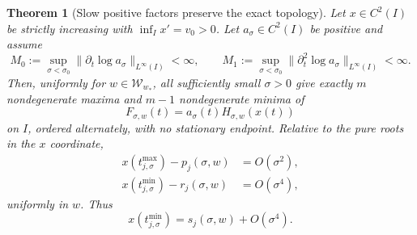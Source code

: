 \documentclass{iopjournal}
\theoremstyle{plain}
\newtheorem{theorem}{Theorem}
\theoremstyle{definition}
\begin{document}
\begin{theorem}[Slow positive factors preserve the exact topology]
\label{thm:exactmfull-slow-factor}
Let \(x\in C^2(I)\) be strictly increasing with
\(\inf_Ix'=v_0>0\).  Let \(a_\sigma\in C^2(I)\) be positive and assume
\begin{equation}
 M_0:=\sup_{\sigma<\sigma_0}
 \|\partial_t\log a_\sigma\|_{L^\infty(I)}<\infty,
 \qquad
 M_1:=\sup_{\sigma<\sigma_0}
 \|\partial_t^2\log a_\sigma\|_{L^\infty(I)}<\infty.
 \label{eq:exactmfull-slow-factor-hypothesis}
\end{equation}
Then, uniformly for \(w\in\mathcal W_{w_*}\), all sufficiently small
\(\sigma>0\) give exactly \(m\) nondegenerate maxima and \(m-1\)
nondegenerate minima of
\begin{equation}
 F_{\sigma,w}(t)=a_\sigma(t)H_{\sigma,w}(x(t))
 \label{eq:exactmfull-slow-product}
\end{equation}
on \(I\), ordered alternately, with no stationary endpoint.  Relative to the
pure roots in the \(x\) coordinate,
\begin{align}
 x(t_{j,\sigma}^{\max})-p_j(\sigma,w)&=O(\sigma^2),
 \label{eq:exactmfull-slow-peak-shift}\\
 x(t_{j,\sigma}^{\min})-r_j(\sigma,w)&=O(\sigma^4),
 \label{eq:exactmfull-slow-valley-shift}
\end{align}
uniformly in \(w\).  Thus
\begin{equation}
 x(t_{j,\sigma}^{\min})=s_j(\sigma,w)+O(\sigma^4).
 \label{eq:exactmfull-slow-valley-location}
\end{equation}
\end{theorem}
\end{document}
